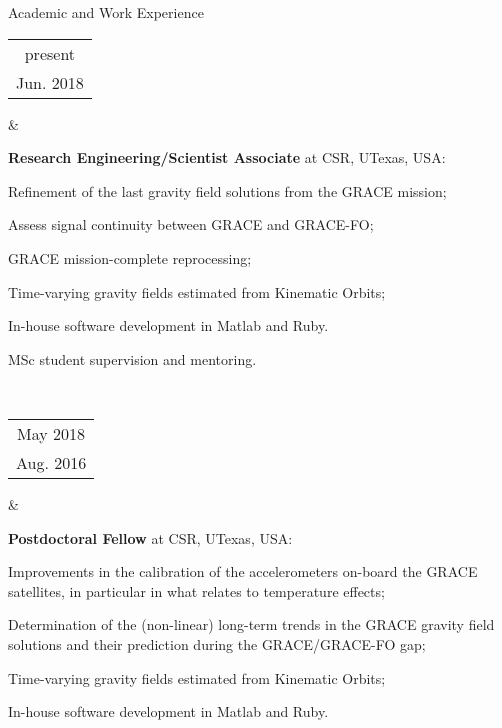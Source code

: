 \documentclass[a4paper,9pt]{article}
\begin{document}



\begin{cvsection}{Academic and Work Experience}

  \begin{tabular}{c}
  present \\
  Jun. 2018 \\ 
  \end{tabular} 
  &
  \begin{itti}
    \item \textbf{Research Engineering/Scientist Associate} at \acf{CSR}, \acf{UTexas}, \ac{USA}:
    \begin{ittib}
      \item Refinement of the last gravity field solutions from the \acf{GRACE} mission;
      \item Assess signal continuity between \ac{GRACE} and \ac{GRACE-FO};
      \item \ac{GRACE} mission-complete reprocessing;
      \item Time-varying gravity fields estimated from Kinematic Orbits;
      \item In-house software development in Matlab and Ruby.
      \item MSc student supervision and mentoring.
    \end{ittib}
  \end{itti}\\

  \begin{tabular}{c}
  May 2018 \\
  Aug. 2016 \\ 
  \end{tabular} 
  &
  \begin{itti}
    \item \textbf{Postdoctoral Fellow} at \acf{CSR}, \acf{UTexas}, \ac{USA}:
    \begin{ittib}
      \item Improvements in the calibration of the accelerometers on-board the \ac{GRACE} satellites, in particular in what relates to temperature effects;
      \item Determination of the (non-linear) long-term trends in the \ac{GRACE} gravity field solutions and their prediction during the \ac{GRACE}\slash\ac{GRACE-FO} gap;
      \item Time-varying gravity fields estimated from Kinematic Orbits;
      \item In-house software development in Matlab and Ruby.
    \end{ittib}
  \end{itti}\\


\end{cvsection}
\end{document}
